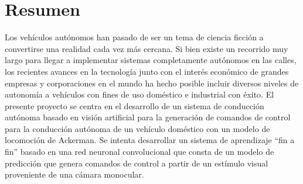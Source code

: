 \chapter*{Resumen} %

Los vehículos autónomos han pasado de ser un tema de ciencia ficción a convertirse una realidad cada vez más 
cercana. Si bien existe un recorrido muy largo para llegar a implementar sistemas completamente autónomos en las calles, 
los recientes avances en la tecnología junto con el interés económico de grandes empresas y corporaciones en el mundo 
ha hecho posible incluir diversos niveles de autonomía a vehículos con fines de uso doméstico e industrial con éxito.
El presente proyecto se centra en el desarrollo de un sistema de conducción autónoma basado en visión artificial para 
la generación de comandos de control para la conducción autónoma de un vehículo doméstico con un modelo de locomoción 
de Ackerman. Se intenta desarrollar un sistema de aprendizaje “fin a fin” basado en una red neuronal convolucional
que consta de un modelo de predicción que genera comandos de control a partir de un estímulo visual proveniente 
de una cámara monocular.
